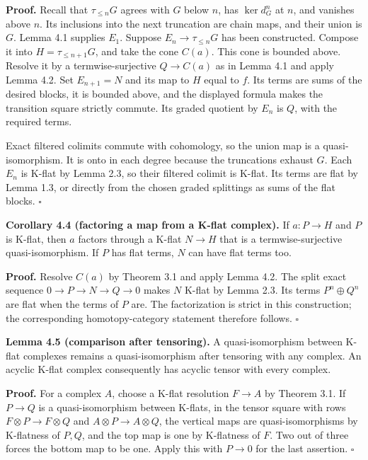 \documentclass[
  english,
  11pt,
  a4paper,
]{article}
\begin{document}
\textbf{Proof.} Recall that \(\tau_{\le n}G\) agrees with \(G\) below
\(n\), has \(\ker d_G^n\) at \(n\), and vanishes above \(n\). Its
inclusions into the next truncation are chain maps, and their union is
\(G\). Lemma 4.1 supplies \(E_1\). Suppose \(E_n\to\tau_{\le n}G\) has
been constructed. Compose it into \(H=\tau_{\le n+1}G\), and take the
cone \(C(a)\). This cone is bounded above. Resolve it by a
termwise-surjective \(Q\to C(a)\) as in Lemma 4.1 and apply Lemma 4.2.
Set \(E_{n+1}=N\) and its map to \(H\) equal to \(f\). Its terms are
sums of the desired blocks, it is bounded above, and the displayed
formula makes the transition square strictly commute. Its graded
quotient by \(E_n\) is \(Q\), with the required terms.

Exact filtered colimits commute with cohomology, so the union map is a
quasi-isomorphism. It is onto in each degree because the truncations
exhaust \(G\). Each \(E_n\) is K-flat by Lemma 2.3, so their filtered
colimit is K-flat. Its terms are flat by Lemma 1.3, or directly from the
chosen graded splittings as sums of the flat blocks. \(\square\)

\textbf{Corollary 4.4 (factoring a map from a K-flat complex).} If
\(a:P\to H\) and \(P\) is K-flat, then \(a\) factors through a K-flat
\(N\to H\) that is a termwise-surjective quasi-isomorphism. If \(P\) has
flat terms, \(N\) can have flat terms too.

\textbf{Proof.} Resolve \(C(a)\) by Theorem 3.1 and apply Lemma 4.2. The
split exact sequence \(0\to P\to N\to Q\to0\) makes \(N\) K-flat by
Lemma 2.3. Its terms \(P^n\oplus Q^n\) are flat when the terms of \(P\)
are. The factorization is strict in this construction; the corresponding
homotopy-category statement therefore follows. \(\square\)

\textbf{Lemma 4.5 (comparison after tensoring).} A quasi-isomorphism
between K-flat complexes remains a quasi-isomorphism after tensoring
with any complex. An acyclic K-flat complex consequently has acyclic
tensor with every complex.

\textbf{Proof.} For a complex \(A\), choose a K-flat resolution
\(F\to A\) by Theorem 3.1. If \(P\to Q\) is a quasi-isomorphism between
K-flats, in the tensor square with rows \(F\otimes P\to F\otimes Q\) and
\(A\otimes P\to A\otimes Q\), the vertical maps are quasi-isomorphisms
by K-flatness of \(P,Q\), and the top map is one by K-flatness of \(F\).
Two out of three forces the bottom map to be one. Apply this with
\(P\to0\) for the last assertion. \(\square\)
\end{document}
